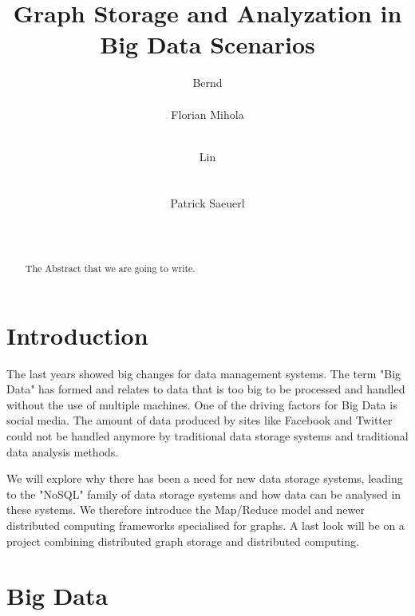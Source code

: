 \documentclass{acm_proc_article-sp}
\begin{document}
\title{Graph Storage and Analyzation in Big Data Scenarios}

\author{
\alignauthor
Bernd\\
       \\
\alignauthor Florian Mihola \\
       \\
\and
\alignauthor Lin
       \\
       \\
       \\
\alignauthor Patrick Saeuerl\\
       \\
	   \\
}


\maketitle
\begin{abstract}
The Abstract that we are going to write.
\end{abstract}

\section{Introduction}

The last years showed big changes for data management systems. The term "Big Data" has formed and relates to data that is too big to be processed and handled without the use of multiple machines.
One of the driving factors for Big Data is social media. The amount of data produced by sites like Facebook and Twitter could not be handled anymore by traditional data storage systems and traditional data analysis methods.

We will explore why there has been a need for new data storage systems, leading to the "NoSQL" family of data storage systems and how data can be analysed in these systems. We therefore introduce the Map/Reduce model and newer distributed computing frameworks specialised for graphs. A last look will be on a project combining distributed graph storage and distributed computing.

\section{Big Data}
\end{document}
